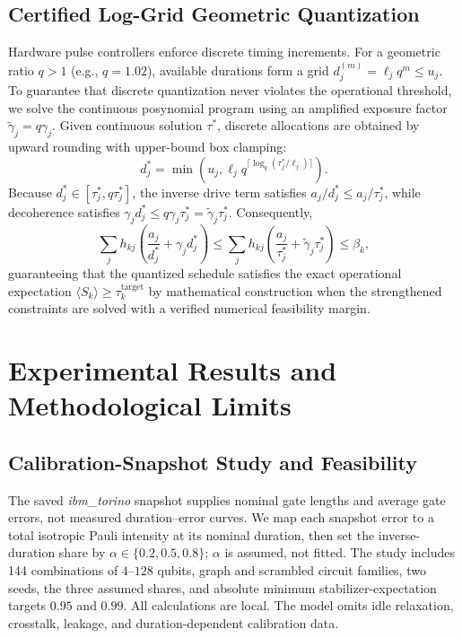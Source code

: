 \documentclass[10pt,letterpaper,journal]{IEEEtran}
\begin{document}
\subsection{Certified Log-Grid Geometric Quantization}
Hardware pulse controllers enforce discrete timing increments. For a geometric ratio $q > 1$ (e.g., $q = 1.02$), available durations form a grid $d_j^{(m)} = \ell_j q^m \le u_j$. To guarantee that discrete quantization never violates the operational threshold, we solve the continuous posynomial program using an amplified exposure factor $\tilde{\gamma}_j = q \gamma_j$. Given continuous solution $\tau^*$, discrete allocations are obtained by upward rounding with upper-bound box clamping:
\begin{equation}
d_j^* = \min\left(u_j, \ell_j q^{\lceil \log_q (\tau_j^* / \ell_j) \rceil}\right).
\end{equation}
Because $d_j^* \in [\tau_j^*, q \tau_j^*]$, the inverse drive term satisfies $a_j / d_j^* \le a_j / \tau_j^*$, while decoherence satisfies $\gamma_j d_j^* \le q \gamma_j \tau_j^* = \tilde{\gamma}_j \tau_j^*$. Consequently,
\begin{equation}
\sum_j h_{kj} \left( \frac{a_j}{d_j^*} + \gamma_j d_j^* \right) \le \sum_j h_{kj} \left( \frac{a_j}{\tau_j^*} + \tilde{\gamma}_j \tau_j^* \right) \le \beta_k,
\end{equation}
guaranteeing that the quantized schedule satisfies the exact operational expectation $\langle S_k \rangle \ge \tau_k^{\mathrm{target}}$ by mathematical construction when the strengthened constraints are solved with a verified numerical feasibility margin.



\section{Experimental Results and Methodological Limits}

\subsection{Calibration-Snapshot Study and Feasibility}
The saved \emph{ibm\_torino} snapshot supplies nominal gate lengths and average gate errors, not measured duration--error curves. We map each snapshot error to a total isotropic Pauli intensity at its nominal duration, then set the inverse-duration share by $\alpha\in\{0.2,0.5,0.8\}$; $\alpha$ is assumed, not fitted. The study includes 144 combinations of $4$--$128$ qubits, graph and scrambled circuit families, two seeds, the three assumed shares, and absolute minimum stabilizer-expectation targets $0.95$ and $0.99$. All calculations are local. The model omits idle relaxation, crosstalk, leakage, and duration-dependent calibration data.
\end{document}
